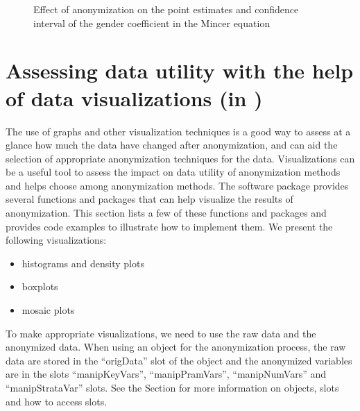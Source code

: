 \documentclass[letterpaper,10pt,english]{sphinxmanual}
\begin{document}
\begin{figure}[htbp]
\centering
\capstart

\noindent{}
\caption{Effect of anonymization on the point estimates and confidence interval of the gender coefficient in the Mincer equation}\label{\detokenize{utility:fig62}}\label{\detokenize{utility:id4}}\end{figure}


\section{Assessing data utility with the help of data visualizations (in )}
\label{\detokenize{utility:assessing-data-utility-with-the-help-of-data-visualizations-in-r}}
The use of graphs and other visualization techniques is a good way to
assess at a glance how much the data have changed after anonymization,
and can aid the selection of appropriate anonymization techniques for
the data. Visualizations can be a useful tool to assess the impact on
data utility of anonymization methods and helps choose among
anonymization methods. The software package  provides several
functions and packages that can help visualize the results of
anonymization. This section lists a few of these functions and packages
and provides code examples to illustrate how to implement them. We
present the following visualizations:
\begin{itemize}
\item {} 
histograms and density plots

\item {} 
boxplots

\item {} 
mosaic plots

\end{itemize}

To make appropriate visualizations, we need to use the raw data and the
anonymized data. When using an  object for the anonymization
process, the raw data are stored in the “origData” slot of the object
and the anonymized variables are in the slots “manipKeyVars”,
“manipPramVars”, “manipNumVars” and “manipStrataVar” slots. See the Section
for more information on  objects, slots and how to access
slots.
\end{document}
